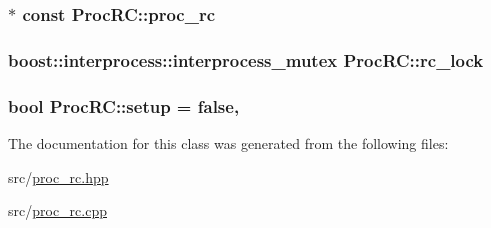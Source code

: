 \subsubsection[{\texorpdfstring{proc\+\_\+rc}{proc_rc}}]{$\ast$ const Proc\+R\+C\+::proc\+\_\+rc\hspace{0.3cm}{\ttfamily [private]}}\hypertarget{class_proc_r_c_acf0eb4d339c6f39d5574a9bfa0048e07}{}\label{class_proc_r_c_acf0eb4d339c6f39d5574a9bfa0048e07}
\subsubsection[{\texorpdfstring{rc\+\_\+lock}{rc_lock}}]{\setlength{\rightskip}{0pt plus 5cm}boost\+::interprocess\+::interprocess\+\_\+mutex Proc\+R\+C\+::rc\+\_\+lock\hspace{0.3cm}{\ttfamily [private]}}\hypertarget{class_proc_r_c_a546b769a0beb94b946e6d298a50568f5}{}\label{class_proc_r_c_a546b769a0beb94b946e6d298a50568f5}
\subsubsection[{\texorpdfstring{setup}{setup}}]{\setlength{\rightskip}{0pt plus 5cm}bool Proc\+R\+C\+::setup = false\hspace{0.3cm}{\ttfamily [static]}, {\ttfamily [private]}}\hypertarget{class_proc_r_c_acccb74d8597ab4b0041ba32ea64ea06d}{}\label{class_proc_r_c_acccb74d8597ab4b0041ba32ea64ea06d}


The documentation for this class was generated from the following files\+:\begin{DoxyCompactItemize}
\item 
src/\hyperlink{proc__rc_8hpp}{proc\+\_\+rc.\+hpp}\item 
src/\hyperlink{proc__rc_8cpp}{proc\+\_\+rc.\+cpp}\end{DoxyCompactItemize}
